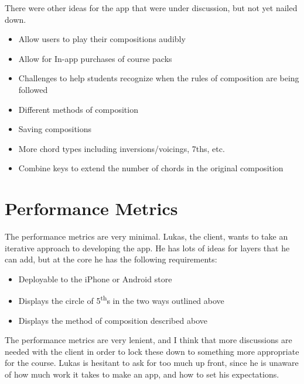 \documentclass[onecolumn, draftclsnofoot,10pt, compsoc]{IEEEtran}
\begin{document}
\par
There were other ideas for the app that were under discussion, but not yet nailed down.
\begin{itemize}
\item Allow users to play their compositions audibly
\item Allow for In-app purchases of course packs
\item Challenges to help students recognize when the rules of composition are being followed
\item Different methods of composition
\item Saving compositions
\item More chord types including inversions/voicings, 7ths, etc.
\item Combine keys to extend the number of chords in the original composition
\end {itemize}
\clearpage

\section{Performance Metrics}

The performance metrics are very minimal.
Lukas, the client, wants to take an iterative approach to developing the app.
He has lots of ideas for layers that he can add, but at the core he has the following requirements:
\begin{itemize}
\item Deployable to the iPhone or Android store
\item Displays the circle of 5\textsuperscript{th}s in the two ways outlined above
\item Displays the method of composition described above
\end {itemize}

\par
The performance metrics are very lenient, and I think that more discussions are needed with the client in order to lock these down to something more appropriate for the course.
Lukas is hesitant to ask for too much up front, since he is unaware of how much work it takes to make an app, and how to set his expectations.
\end{document}
